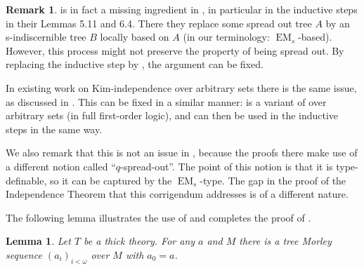\documentclass[a4paper, reqno]{amsart}
\newtheorem{lemma}[theorem]{Lemma}
\theoremstyle{definition}
\newtheorem{remark}[theorem]{Remark}
\theoremstyle{repeat}
\DeclareMathOperator{\EM}{EM}
\begin{document}
\begin{remark}
 is in fact a missing ingredient in \cite{kaplan_kim-independence_2020}, in particular in the inductive steps in their Lemmas 5.11 and 6.4. There they replace some spread out tree $A$ by an s-indiscernible tree $B$ locally based on $A$ (in our terminology: $\EM_s$-based). However, this process might not preserve the property of being spread out. By replacing the inductive step by , the argument can be fixed.

In existing work on Kim-independence over arbitrary sets there is the same issue, as discussed in \cite[Page 7]{chernikov_transitivity_2023}. This can be fixed in a similar manner: \cite[Lemma 1.15]{chernikov_transitivity_2023} is a variant of  over arbitrary sets (in full first-order logic), and can then be used in the inductive steps in the same way.

We also remark that this is not an issue in \cite{dobrowolski_kim-independence_2022}, because the proofs there make use of a different notion called ``$q$-spread-out''. The point of this notion is that it is type-definable, so it can be captured by the $\EM_s$-type. The gap in the proof of the Independence Theorem that this corrigendum addresses is of a different nature.
\end{remark}
The following lemma illustrates the use of  and completes the proof of .
\begin{lemma}
Let $T$ be a thick theory. For any $a$ and $M$ there is a tree Morley sequence $(a_i)_{i < \omega}$ over $M$ with $a_0 = a$.
\end{lemma}
\end{document}
